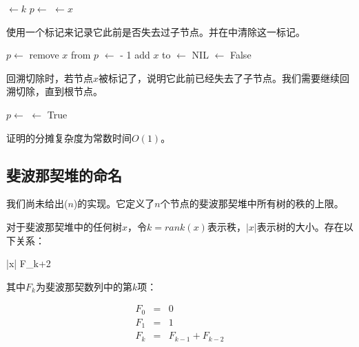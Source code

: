 \documentclass[b5paper]{ctexart}
\begin{document}
\begin{algorithmic}[1]
  \State {} $\gets k$
  \State $p \gets $ 
    \State {}
    \State {} 
  \EndIf
    \State {} $\gets x$
  \EndIf
\EndFunction
\end{algorithmic}

使用一个标记来记录它此前是否失去过子节点。并在中清除这一标记。

\begin{algorithmic}[1]
  \State $p \gets $ 
  \State remove $x$ from $p$
  \State {} $\gets$  - 1
  \State add $x$ to 
  \State {} $\gets$ NIL
  \State {} $\gets$ False
\EndFunction
\end{algorithmic}

回溯切除时，若节点$x$被标记了，说明它此前已经失去了子节点。我们需要继续回溯切除，直到根节点。

\begin{algorithmic}[1]
  \State $p \gets $ 
      \State {} $\gets$ True
    \Else
      \State {}
      \State {}
    \EndIf
  \EndIf
\EndFunction
\end{algorithmic}

\begin{Exercise}
证明的分摊复杂度为常数时间$O(1)$。
\end{Exercise}

\subsection{斐波那契堆的命名}

我们尚未给出($n$)的实现。它定义了$n$个节点的斐波那契堆中所有树的秩的上限。

\begin{lemma}
\label{lemma:Fib-degree}
对于斐波那契堆中的任何树$x$，令$k = rank(x)$表示秩，$|x|$表示树的大小。存在以下关系：

\be
  |x| \geq F_{k+2}
\ee

其中$F_k$为斐波那契数列中的第$k$项：

\[
\begin{array}{rcl}
F_0 & = & 0 \\
F_1 & = & 1 \\
F_k & = & F_{k-1} + F_{k-2} \\
\end{array}
\]
\end{lemma}
\end{document}

